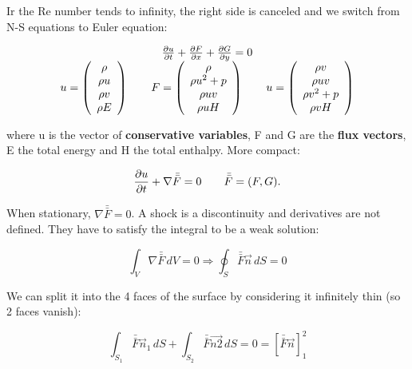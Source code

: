	Ir the Re number tends to infinity, the right side is canceled and we switch from N-S equations to Euler equation:
	
	\begin{equation}
	\begin{array}{c}
	\frac{\D u}{\D t} + \frac{\D F}{\D x} + \frac{\D G}{\D y} = 0 \\
	u= \left( \begin{array}{c}
	\rho \\
	\rho u\\
	\rho v\\
	\rho E
	\end{array}
	\right)
	\qquad 
	F= \left( \begin{array}{c}
	\rho \\
	\rho u^2 + p\\
	\rho uv\\
	\rho uH
	\end{array}
	\right)
	\qquad 
	u= \left( \begin{array}{c}
	\rho v\\
	\rho uv\\
	\rho v^2 +p\\
	\rho vH
	\end{array}
	\right)
	\end{array}
	\end{equation}
	
	where u is the vector of \textbf{conservative variables}, F and G are the \textbf{flux vectors}, E the total energy and H the total enthalpy. More compact: 
	
	\begin{equation}
	\frac{\D  u}{\D t} + \nabla \bar{\bar{F}} = 0 \qquad \bar{\bar{F}} = (F,G).
	\end{equation}
	
	When stationary, $\nabla \bar{\bar{F}} = 0$. A shock is a discontinuity and derivatives are not defined. They have to satisfy the integral to be a weak solution: 
	
	\begin{equation}
	\int _V \nabla \bar{\bar{F}}\, dV = 0 \Rightarrow \oint _S \bar{\bar{F}}\vec{n} \, dS= 0
	\end{equation}
	
	We can split it into the 4 faces of the surface by considering it infinitely thin (so 2 faces vanish): 
	
	\begin{equation}
	\int _{S_1} \bar{\bar{F}}\vec{n}_1 \, dS + \int _{S_2} \bar{\bar{F}}\vec{n2} \, dS = 0 = [\bar{\bar{F}}\vec{n}]_1^2
	\end{equation}
	
